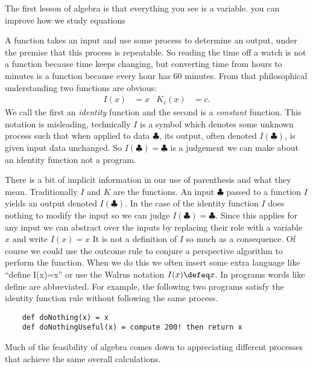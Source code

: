 
The first lesson of algebra is that everything you see is a variable. you can improve how we study equations 

A function takes an input and use some process to determine an output,
under the premise that this process is repeatable.  So reading the 
time off a watch is not a function because time keeps changing, 
but converting time from hours to minutes is a function because 
every hour has 60 minutes.  From that philosophical understanding 
two functions are obvious:
\begin{align*}
    I(x) & = x & 
    K_c(x) & = c.
\end{align*}
We call the first an \emph{identity} function and the second is a \emph{constant}
function.  This notation is misleading, technically $I$ is a symbol
which denotes some unknown process such that when applied to data $\clubsuit$,
its output, often denoted $I(\clubsuit)$, is given input data unchanged.
So $I(\clubsuit)=\clubsuit$ is a judgement we can make about an identity 
function not a program.

There is a bit of implicit information in our use 
of parenthesis and what they mean.  Traditionally $I$ and $K$ are 
the functions.  An input $\clubsuit$ passed to a function $I$ 
yields an output denoted $I(\clubsuit)$.  In the case of the identity 
function $I$ does nothing to modify the input so we can judge 
$I(\clubsuit)=\clubsuit$.  Since this applies for any input we 
can abstract over the inputs by replacing their role with a variable 
$x$ and write $I(x)=x$  It is not a definition of $I$ so much as 
a consequence.  Of course we could use the outcome rule to conjure 
a perspective algorithm to perform the function.  When we do this 
we often insert some extra language like ``define I(x)=x'' or 
use the Walrus notation $I(x)\defeq x$.  In programs words like 
define are abbreviated.  For example, the following two programs satisfy
the identity function rule without following the same process.
\begin{lstlisting}
    def doNothing(x) = x 
    def doNothingUseful(x) = compute 200! then return x
\end{lstlisting}
Much of the feasibility of algebra comes down to appreciating 
different processes that achieve the same overall calculations.

